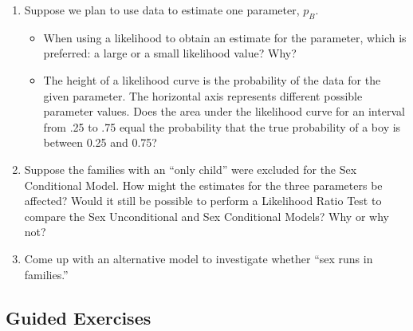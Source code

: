 \documentclass[
]{krantz}
\providecommand{\tightlist}{%
  \setlength{\itemsep}{0pt}\setlength{\parskip}{0pt}}
\begin{document}
\begin{enumerate}
\def\labelenumi{\arabic{enumi}.}
\tightlist
\item
  Suppose we plan to use data to estimate one parameter, \(p_B\).

  \begin{itemize}
  \tightlist
  \item
    When using a likelihood to obtain an estimate for the parameter, which is preferred: a large or a small likelihood value? Why?
  \item
    The height of a likelihood curve is the probability of the data for the given parameter. The horizontal axis represents different
    possible parameter values. Does the area under the likelihood curve for an interval from .25 to .75 equal the probability that the
    true probability of a boy is between 0.25 and 0.75?
  \end{itemize}
\item
  Suppose the families with an ``only child'' were excluded for the Sex Conditional Model. How might the estimates for the three parameters be affected? Would it still be possible to perform a Likelihood Ratio Test to compare the Sex Unconditional and Sex Conditional Models? Why or why not?
\item
  Come up with an alternative model to investigate whether ``sex runs in families.''
\end{enumerate}

\hypertarget{guided-exercises-1}{%
\subsection{Guided Exercises}\label{guided-exercises-1}}
\end{document}
